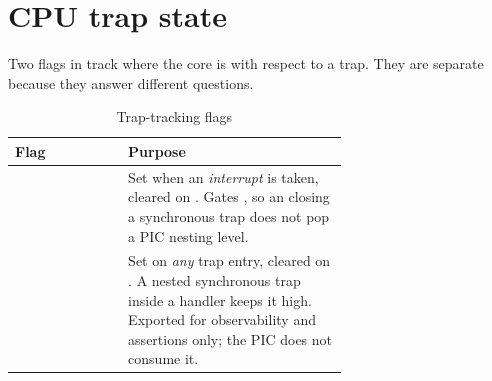 \section{CPU trap state}

Two flags in  track where the core is with respect to a trap.
They are separate because they answer different questions.

\begin{table}[H]
\centering
\caption{Trap-tracking flags}
\label{tab:trapflags}
\begin{tabular}{@{}lL{0.66\linewidth}@{}}
\toprule
\textbf{Flag} & \textbf{Purpose} \\
\midrule
{}      & Set when an \emph{interrupt} is taken, cleared on . Gates
  , so an  closing a synchronous trap does not pop a PIC
  nesting level. \\
 & Set on \emph{any} trap entry, cleared on . A nested
  synchronous trap inside a handler keeps it high. Exported for observability and
  assertions only; the PIC does not consume it. \\
\bottomrule
\end{tabular}
\end{table}

